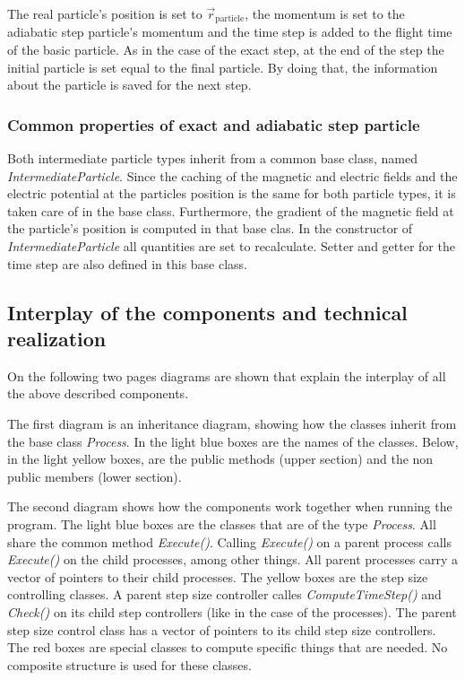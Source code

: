 	The real particle's position is set to $\vec{r}_{\mathrm{particle}}$, the momentum is set to the adiabatic step particle's momentum and the time step is added to the flight time of the basic particle.
	As in the case of the exact step, at the end of the step the initial particle is set equal to the final particle. By doing that, the information about the particle is saved for the next step.


    \subsubsection*{Common properties of exact and adiabatic step particle}
    Both intermediate particle types inherit from a common base class, named \textit{IntermediateParticle}. Since the caching of the magnetic and electric fields and the electric potential at the particles position is the same for both particle types, it is taken care of in the base class. Furthermore, the gradient of the magnetic field at the particle's position is computed in that base clas. In the constructor of \textit{IntermediateParticle} all quantities are set to recalculate. Setter and getter for the time step are also defined in this base class.


\subsection{Interplay of the components and technical realization}
On the following two pages diagrams are shown that explain the interplay of all the above described components.

The first diagram is an inheritance diagram, showing how the classes inherit from the base class \textit{Process}. In the light blue boxes are the names of the classes. Below, in the light yellow boxes, are the public methods (upper section) and the non public members (lower section).

The second diagram shows how the components work together when running the program. The light blue boxes are the classes that are of the type \textit{Process}. All share the common method \textit{Execute()}. Calling \textit{Execute()} on a parent process calls \textit{Execute()} on the child processes, among other things. All parent processes carry a vector of pointers to their child processes. The yellow boxes are the step size controlling classes. A parent step size controller calles \textit{ComputeTimeStep()} and \textit{Check()} on its child step controllers (like in the case of the processes). The parent step size control class has a vector of pointers to its child step size controllers. The red boxes are special classes to compute specific things that are needed. No composite structure is used for these classes.  

